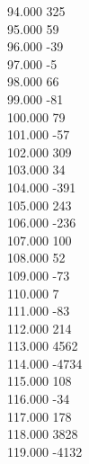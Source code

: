 { 94.000	325 \\
 95.000	59 \\
 96.000	-39 \\
 97.000	-5 \\
 98.000	66 \\
 99.000	-81 \\
 100.000	79 \\
 101.000	-57 \\
 102.000	309 \\
 103.000	34 \\
 104.000	-391 \\
 105.000	243 \\
 106.000	-236 \\
 107.000	100 \\
 108.000	52 \\
 109.000	-73 \\
 110.000	7 \\
 111.000	-83 \\
 112.000	214 \\
 113.000	4562 \\
 114.000	-4734 \\
 115.000	108 \\
 116.000	-34 \\
 117.000	178 \\
 118.000	3828 \\
 119.000	-4132 \\
}
